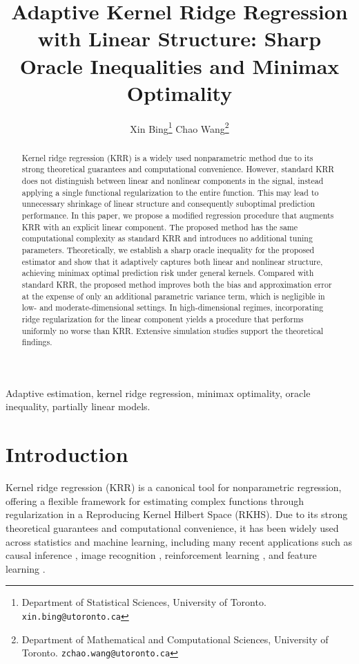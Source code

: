 \documentclass[11pt,twoside]{article}
\title{Adaptive Kernel Ridge Regression with Linear Structure: Sharp Oracle Inequalities and Minimax Optimality}
\author{Xin Bing\thanks{Department of 
Statistical Sciences, University of Toronto.  \texttt{xin.bing@utoronto.ca}}
\hspace{1cm}Chao Wang\thanks{Department of Mathematical and Computational Sciences, University of Toronto.  \texttt{zchao.wang@utoronto.ca}}}
\begin{document}
\maketitle

\begin{abstract}
      Kernel ridge regression (KRR) is a widely used nonparametric method due to its strong theoretical guarantees and computational convenience. However, standard KRR does not distinguish between linear and nonlinear components in the signal, instead applying a single functional regularization to the entire function. This may lead to unnecessary shrinkage of linear structure and consequently suboptimal prediction performance. In this paper, we propose a modified regression procedure that augments KRR with an explicit linear component. The proposed method has the same computational complexity as standard KRR and introduces no additional tuning parameters. Theoretically, we establish a sharp oracle inequality for the proposed estimator and show that it adaptively captures both linear and nonlinear structure, achieving minimax optimal prediction risk under general kernels. Compared with standard KRR, the proposed method improves both the bias and approximation error at the expense of only an additional parametric variance term, which is negligible in low- and moderate-dimensional settings. In high-dimensional regimes, incorporating ridge regularization for the linear component yields a procedure that performs uniformly no worse than KRR. Extensive simulation studies support the theoretical findings.  
\end{abstract}


 Adaptive estimation, kernel ridge regression, minimax optimality, oracle inequality, partially linear models. 




\section{Introduction}\label{sec:intro}

Kernel ridge regression (KRR) is a canonical tool for nonparametric regression, offering a flexible framework for estimating complex functions through regularization in a Reproducing Kernel Hilbert Space (RKHS). Due to its strong theoretical guarantees and computational convenience, it has been widely used across statistics and machine learning, including many recent applications such as causal inference \citep{singh2024kernel}, image recognition \citep{an2007face}, reinforcement learning \citep{duan2024optimal}, and feature learning \citep{radhakrishnan2024mechanism}. 
\end{document}
